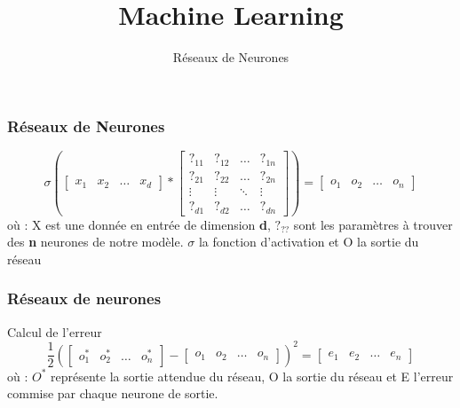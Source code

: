 \documentclass{formation}
\title{Machine Learning}
\subtitle{Réseaux de Neurones}
\begin{document}
\maketitle

\begin{frame}
  \frametitle{Réseaux de Neurones}
  \[
  \sigma \left(
  \begin{bmatrix}
    x_{1} & x_{2} & \dots & x_{d}
  \end{bmatrix}
  *
  \begin{bmatrix}
    ?_{11} & ?_{12} & \dots  & ?_{1n} \\
    ?_{21} & ?_{22} & \dots  & ?_{2n} \\
    \vdots & \vdots & \ddots & \vdots \\
    ?_{d1} & ?_{d2} & \dots  & ?_{dn}
  \end{bmatrix}
  \right )
  =
  \begin{bmatrix}
    o_{1} & o_{2} & \dots & o_{n}
  \end{bmatrix}
  \]
  \newline
  où :
  \newline
  X est une donnée en entrée de dimension \textbf{d},
  \newline
  $?_{??}$ sont les paramètres à trouver des \textbf{n} neurones de notre modèle.
  \newline
  $\sigma$ la fonction d'activation et
  \newline
  O la sortie du réseau
\end{frame}

\begin{frame}
  \frametitle{Réseaux de neurones}
  Calcul de l'erreur
  \[
  \frac{1}{2}\left (
  \begin{bmatrix}
    o_{1}^* & o_{2}^* & \dots & o_{n}^*
  \end{bmatrix}
  -
  \begin{bmatrix}
    o_{1} & o_{2} & \dots & o_{n}
  \end{bmatrix}
  \right )^2
  =
  \begin{bmatrix}
    e_{1} & e_{2} & \dots & e_{n}
  \end{bmatrix}
  \]
  \newline
  où :
  \newline
  $O^*$ représente la sortie attendue du réseau,
  \newline
  O la sortie du réseau et
  \newline
  E l'erreur commise par chaque neurone de sortie.
  \newline
\end{frame}
\end{document}
